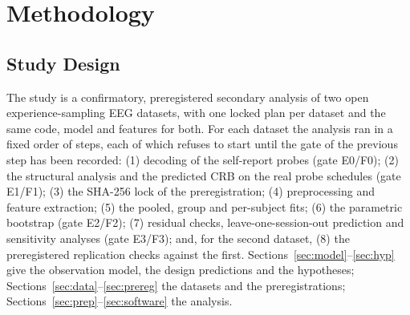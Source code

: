 \section{Methodology}
\label{sec:methods}

\subsection{Study Design}
\label{sec:design}
The study is a confirmatory, preregistered secondary analysis of two open experience-sampling EEG datasets, with one locked plan per dataset and the same code, model and features for both. For each dataset the analysis ran in a fixed order of steps, each of which refuses to start until the gate of the previous step has been recorded: (1) decoding of the self-report probes (gate E0/F0); (2) the structural analysis and the predicted CRB on the real probe schedules (gate E1/F1); (3) the SHA-256 lock of the preregistration; (4) preprocessing and feature extraction; (5) the pooled, group and per-subject fits; (6) the parametric bootstrap (gate E2/F2); (7) residual checks, leave-one-session-out prediction and sensitivity analyses (gate E3/F3); and, for the second dataset, (8) the preregistered replication checks against the first. Sections~\ref{sec:model}--\ref{sec:hyp} give the observation model, the design predictions and the hypotheses; Sections~\ref{sec:data}--\ref{sec:prereg} the datasets and the preregistrations; Sections~\ref{sec:prep}--\ref{sec:software} the analysis.


